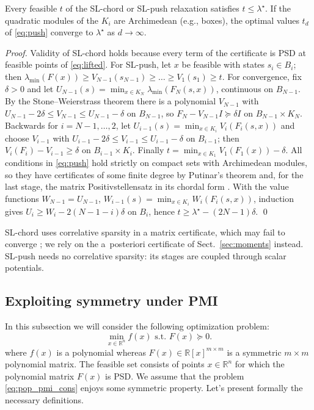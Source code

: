\documentclass[smallextended]{svjour3}
\newcommand{\R}{\mathbb{R}}
\newcommand{\lmin}{\lambda_{\min}}
\begin{document}
\begin{proposition}
\label{prop:valid}
Every feasible $t$ of the SL-chord or SL-push relaxation satisfies
$t\le\lambda^\star$. If the quadratic modules of the $K_i$ are Archimedean
(e.g., boxes), the optimal values $t_d$ of \eqref{eq:push} converge to
$\lambda^\star$ as $d\to\infty$.
\end{proposition}

\begin{proof}
Validity of SL-chord holds because every term of the certificate is PSD at
feasible points of \eqref{eq:lifted}. For SL-push, let $x$ be feasible with
states $s_i\in B_i$; then
$\lmin(F(x))\ge V_{N-1}(s_{N-1})\ge\dots\ge V_1(s_1)\ge t$.
For convergence, fix $\delta>0$ and let
$U_{N-1}(s)=\min_{x\in K_N}\lmin(F_N(s,x))$, continuous on $B_{N-1}$.
By the Stone--Weierstrass theorem there is a polynomial $V_{N-1}$ with
$U_{N-1}-2\delta\le V_{N-1}\le U_{N-1}-\delta$ on $B_{N-1}$, so
$F_N-V_{N-1}I\succeq\delta I$ on $B_{N-1}\times K_N$. Backwards for
$i=N-1,\dots,2$, let $U_{i-1}(s)=\min_{x\in K_i}V_i(F_i(s,x))$ and choose
$V_{i-1}$ with $U_{i-1}-2\delta\le V_{i-1}\le U_{i-1}-\delta$ on $B_{i-1}$;
then $V_i(F_i)-V_{i-1}\ge\delta$ on $B_{i-1}\times K_i$. Finally
$t=\min_{x\in K_1}V_1(F_1(x))-\delta$. All conditions in \eqref{eq:push}
hold strictly on compact sets with Archimedean modules, so they have
certificates of some finite degree by Putinar's theorem \cite{Putinar1993}
and, for the last stage, the matrix Positivstellensatz
\cite{SchererHol2006} in its chordal form \cite{ZhengFantuzzi2023}. With
the value functions $W_{N-1}=U_{N-1}$,
$W_{i-1}(s)=\min_{x\in K_i}W_i(F_i(s,x))$, induction gives
$U_i\ge W_i-2(N-1-i)\delta$ on $B_i$, hence $t\ge\lambda^\star-(2N-1)\delta$.
\qed
\end{proof}

SL-chord uses correlative sparsity in a matrix certificate, which may fail
to converge \cite[Ex.~5.1]{MillerWangGuo2026}; we rely on the a~posteriori
certificate of Sect.~\ref{sec:moments} instead. SL-push needs no
correlative sparsity: its stages are coupled through scalar potentials.

\subsection{Exploiting symmetry under PMI}
In this subsection we will consider the following optimization problem: \begin{equation}\label{eq:pop_pmi_cons}
  \min_{x\in\R^{n}} f(x) \text{ s.t. } F(x)\succeq 0.
\end{equation}
where $f(x)$ is a polynomial whereas $F(x)\in\R[x]^{m\times m}$ is a symmetric $m\times m$ polynomial matrix. The feasible set consists of points $x\in\R^{n}$ for which the polynomial matrix $F(x)$ is PSD. We assume that the problem \eqref{eq:pop_pmi_cons} enjoys some symmetric property. Let's present formally the necessary definitions.
\end{document}
